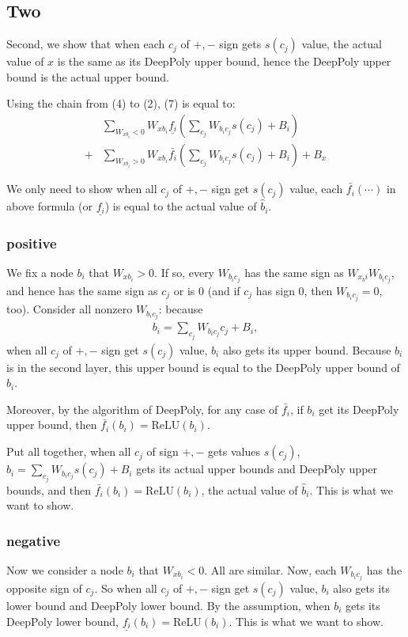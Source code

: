 \documentclass[]{article}
\theoremstyle{definition}
\newcommand{\ReLU}{\mathrm{ReLU}}
\begin{document}
\subsection*{Two} Second, we show that when each $c_j$ of $+,-$ sign gets $s(c_j)$ value, the actual value of $x$ is the same as its DeepPoly upper bound, hence the DeepPoly upper bound is the actual upper bound.

Using the chain from (4) to (2), (7) is equal to: \begin{align*}
&\sum_{W_{xb_i}<0}W_{xb_i}\underline{f_i}(\sum_{c_j}W_{b_ic_j}s(c_j)+B_i)\\
+&\sum_{W_{xb_i}>0}W_{xb_i}\bar{f_i}(\sum_{c_j}W_{b_ic_j}s(c_j)+B_i)+B_x
\end{align*} 

We only need to show when all $c_j$ of $+,-$ sign get $s(c_j)$ value, each $\bar{f_i}(\cdots)$ in above formula (or $\underline{f_i}$) is equal to the actual value of $\hat{b}_i$. 

\subsubsection*{positive} We fix a node $b_i$ that $W_{xb_i}>0$. If so, every $W_{b_ic_j}$ has the same sign as $W_{x_bi}W_{b_ic_j}$, and hence has the same sign as $c_j$ or is $0$ (and if $c_j$ has sign $0$, then $W_{b_ic_j}=0$, too). Consider all nonzero $W_{b_ic_j}$: because \begin{align}
	b_i = \sum_{c_j} W_{b_ic_j}c_j+B_i,
\end{align}  when all $c_j$ of $+,-$ sign get $s(c_j)$ value, $b_i$ also gets its upper bound. Because $b_i$ is in the second layer, this upper bound is equal to the DeepPoly upper bound of $b_i$. 


Moreover, by the algorithm of DeepPoly, for any case of $\bar{f_i}$, if $b_i$ get its DeepPoly upper bound, then $\bar{f_i}(b_i)=\ReLU(b_i)$. 

Put all together, when all $c_j$ of sign $+,-$ gets values $s(c_j)$, $b_i=\sum_{c_j}W_{b_ic_j}s(c_j)+B_i$ gets its actual upper bounds and DeepPoly upper bounds, and then  $\bar{f_i}(b_i)=\ReLU(b_i)$, the actual value of $\hat{b}_i$. This is what we want to show.


\subsubsection*{negative}Now we consider a node $b_i$ that $W_{xb_i}<0$. All are similar. Now, each $W_{b_ic_j}$ has the opposite sign of $c_j$. So when all $c_j$ of $+,-$ sign get $s(c_j)$ value, $b_i$ also gets its lower bound and DeepPoly lower bound. By the assumption, when $b_i$ gets its DeepPoly lower bound, $\underline{f_i}(b_i)=\ReLU(b_i)$. This is what we want to show.
\end{document}

